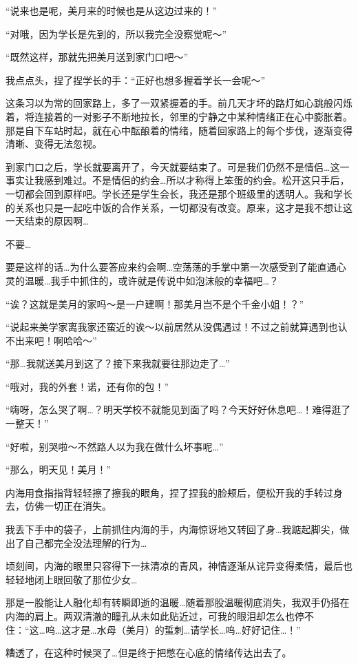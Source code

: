 	“说来也是呢，美月来的时候也是从这边过来的！”

	“对哦，因为学长是先到的，所以我完全没察觉呢～”

	“既然这样，那就先把美月送到家门口吧～”

我点点头，捏了捏学长的手：“正好也想多握着学长一会呢～”

这条习以为常的回家路上，多了一双紧握着的手。前几天才坏的路灯如心跳般闪烁着，将连接着的一对影子不断地拉长，邻里的宁静之中某种情绪正在心中膨胀着。那是自下车站时起，就在心中酝酿着的情绪，随着回家路上的每个步伐，逐渐变得清晰、变得无法忽视。

到家门口之后，学长就要离开了，今天就要结束了。可是我们仍然不是情侣…这一事实让我感到难过。不是情侣的约会…所以才称得上笨蛋的约会。松开这只手后，一切都会回到原样吧。学长还是学生会长，我还是那个班级里的透明人。我和学长的关系也只是一起吃中饭的合作关系，一切都没有改变。原来，这才是我不想让这一天结束的原因啊…

不要…

要是这样的话…为什么要答应来约会啊…空荡荡的手掌中第一次感受到了能直通心灵的温暖…我手中抓住的，或许就是传说中如泡沫般的幸福吧…？

“诶？这就是美月的家吗～是一户建啊！那美月岂不是个千金小姐！？”

“说起来美学家离我家还蛮近的诶～以前居然从没偶遇过！不过之前就算遇到也认不出来吧！啊哈哈～”

“那…我就送美月到这了？接下来我就要往那边走了…”

“哦对，我的外套！诺，还有你的包！”

“嗨呀，怎么哭了啊…？明天学校不就能见到面了吗？今天好好休息吧…！难得逛了一整天！”

“好啦，别哭啦～不然路人以为我在做什么坏事呢…”

“那么，明天见！美月！”

内海用食指指背轻轻擦了擦我的眼角，捏了捏我的脸颊后，便松开我的手转过身去，仿佛一切正在消失。


我丢下手中的袋子，上前抓住内海的手，内海惊讶地又转回了身…我踮起脚尖，做出了自己都完全没法理解的行为…

顷刻间，内海的眼里只容得下一抹清凉的青风，神情逐渐从诧异变得柔情，最后也轻轻地闭上眼回敬了那位少女…

那是一股能让人融化却有转瞬即逝的温暖…随着那股温暖彻底消失，我双手仍搭在内海的肩上。两双清澈的瞳孔从未如此贴近过，可我的眼泪却怎么也停不住：“这…呜…这才是…水母（美月）的蜇刺…请学长…呜…好好记住…！”

糟透了，在这种时候哭了…但是终于把憋在心底的情绪传达出去了。

